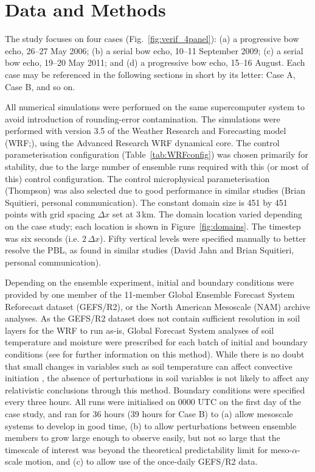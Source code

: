 \documentclass{ametsoc}
\def\gefs{\mbox{GEFS/R2}} %
\begin{document}
\section{Data and Methods}
The study focuses on four cases (Fig.~\ref{fig:verif_4panel}): (a) a progressive bow echo, 26--27 May 2006; (b) a serial bow echo, 10--11 September 2009; (c) a serial bow echo, 19--20 May 2011; and (d) a progressive bow echo, 15--16 August. Each case may be referenced in the following sections in short by its letter: Case A, Case B, and so on.

All numerical simulations were performed on the same supercomputer system to avoid introduction of rounding-error contamination. The simulations were performed with version 3.5 of the Weather Research and Forecasting model (WRF;\citealt{Skamarock2008-yw}), using the Advanced Research WRF dynamical core. The control parameterisation configuration (Table~\ref{tab:WRFconfig}) was chosen primarily for stability, due to the large number of ensemble runs required with this (or most of this) control configuration. The control microphysical parameterisation (Thompson) was also selected due to good performance in similar studies (Brian Squitieri, personal communication). The constant domain size is 451 by 451 points with grid spacing $\Delta x$ set at 3\,km. The domain location varied depending on the case study; each location is shown in Figure~\ref{fig:domains}. The timestep was six seconds (i.e. $2\, \Delta x$). Fifty vertical levels were specified manually to better resolve the PBL, as found in similar studies (David Jahn and Brian Squitieri, personal communication). 

Depending on the ensemble experiment, initial and boundary conditions were provided by one member of the 11-member Global Ensemble Forecast System Reforecast dataset (\gefs), or the North American Mesoscale (NAM) archive analyses. As the \gefs{} dataset does not contain sufficient resolution in soil layers for the WRF to run as-is, Global Forecast System analyses of soil temperature and moisture were prescribed for each batch of initial and boundary conditions (see \citealt{Lawson2013-az} for further information on this method). While there is no doubt that small changes in variables such as soil temperature can affect convective initiation \citep{Clark1995-yy}, the absence of perturbations in soil variables is not likely to affect any relativistic conclusions through this method. Boundary conditions were specified every three hours. All runs were initialised on 0000 UTC on the first day of the case study, and ran for 36 hours (39 hours for Case B) to (a) allow mesoscale systems to develop in good time, (b) to allow perturbations between ensemble members to grow large enough to observe easily, but not so large that the timescale of interest was beyond the theoretical predictability limit for meso-$\alpha$-scale motion, and (c) to allow use of the once-daily \gefs{} data.
\end{document}
